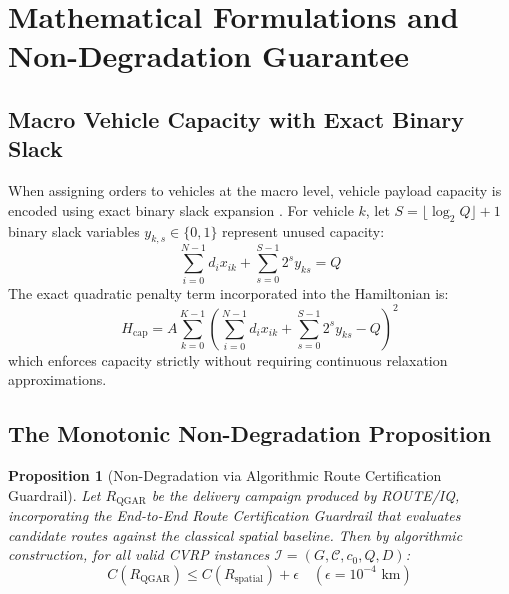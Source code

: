 \documentclass[journal,10pt]{IEEEtran}
\newtheorem{proposition}{Proposition}
\begin{document}
\section{Mathematical Formulations and Non-Degradation Guarantee}

\subsection{Macro Vehicle Capacity with Exact Binary Slack}
When assigning orders to vehicles at the macro level, vehicle payload capacity is encoded using exact binary slack expansion \cite{harwood2021formulating}. For vehicle $k$, let $S = \lfloor \log_2 Q \rfloor + 1$ binary slack variables $y_{k, s} \in \{0, 1\}$ represent unused capacity:
\begin{equation}
\sum_{i=0}^{N-1} d_i x_{ik} + \sum_{s=0}^{S-1} 2^s y_{ks} = Q
\end{equation}
The exact quadratic penalty term incorporated into the Hamiltonian is:
\begin{equation}
H_{\text{cap}} = A \sum_{k=0}^{K-1} \left( \sum_{i=0}^{N-1} d_i x_{ik} + \sum_{s=0}^{S-1} 2^s y_{ks} - Q \right)^2
\end{equation}
which enforces capacity strictly without requiring continuous relaxation approximations.

\subsection{The Monotonic Non-Degradation Proposition}
\begin{proposition}[Non-Degradation via Algorithmic Route Certification Guardrail]
Let $R_{\text{QGAR}}$ be the delivery campaign produced by ROUTE/IQ, incorporating the End-to-End Route Certification Guardrail that evaluates candidate routes against the classical spatial baseline. Then by algorithmic construction, for all valid CVRP instances $\mathcal{I} = (G, \mathcal{C}, c_0, Q, D)$:
\begin{equation}
C(R_{\text{QGAR}}) \le C(R_{\text{spatial}}) + \epsilon \quad (\epsilon = 10^{-4}\text{ km})
\end{equation}
\end{proposition}
\end{document}
